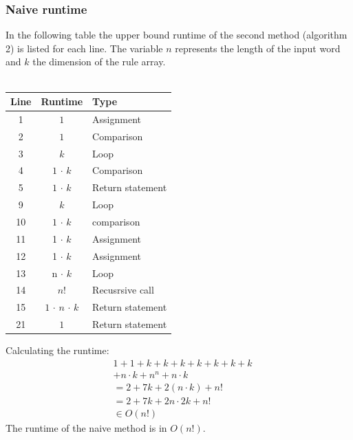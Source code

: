 \documentclass[a4paper, 11pt]{article}
\begin{document}
\subsubsection{Naive runtime}
\label{naiveruntime}

In the following table the upper bound runtime of the second method (algorithm 2) is listed for each line. The variable $n$ represents the length of the input word and $k$ the dimension of the rule array.
\ \\ \ \\
\begin{minipage}{0.5\textwidth}

\begin{tabular}{|c|c|l|}
\hline
Line & Runtime & Type \\
\hline
1 &  $1$ & Assignment \\
2 &  $1$ & Comparison \\
3 & $k$  & Loop \\
4 & $1$ $\cdot$ $k$ & Comparison \\
5 & $1$ $\cdot$ $k$ & Return statement\\
9 & $k$ & Loop \\
10 & $1$ $\cdot$ $k$ & comparison \\
11 & 1 $\cdot$ $k$ & Assignment \\
12 & 1 $\cdot$ $k$ & Assignment\\
13 & n $\cdot$ $k$ & Loop \\
14 & $n!$ & Recusrsive call \\
15 & $1$ $\cdot$ $n$ $\cdot$ $k$ & Return statement\\
21 & $1$ & Return statement \\
\hline
\end{tabular}

\end{minipage}\begin{minipage}{0.5\textwidth}
Calculating the runtime:
\vspace*{-1em}
\begin{align*}
& 1 + 1+ k + k +k + k + k + k + k \\
& + n \cdot k + n^n + n \cdot k \\
& =  2 + 7k + 2(n \cdot k) + n! \\
& = 2 + 7k + 2n \cdot 2k + n! \\
& \in O(n!)
\end{align*}
The runtime of the naive method is in $O(n!)$.
\end{minipage}
\end{document}
